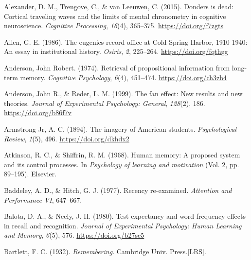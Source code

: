 \documentclass[
  oneside,
  12pt]{crumpbook}
\newlength{\cslhangindent}
\newlength{\cslentryspacingunit} %
\newenvironment{CSLReferences}[2] %
 {%
  \setlength{\parindent}{0pt}
  \ifodd #1
  \let\oldpar\par
  \def\par{\hangindent=\cslhangindent\oldpar}
  \fi
  \setlength{\parskip}{#2\cslentryspacingunit}
 }%
 {}
\begin{document}
\hypertarget{refs}{}
\begin{CSLReferences}{1}{0}
\leavevmode{}%
Alexander, D. M., Trengove, C., \& van Leeuwen, C. (2015). Donders is dead: Cortical traveling waves and the limits of mental chronometry in cognitive neuroscience. \emph{Cognitive Processing}, \emph{16}(4), 365--375. \url{https://doi.org/f7zgts}

\leavevmode{}%
Allen, G. E. (1986). The eugenics record office at {Cold Spring Harbor}, 1910-1940: An essay in institutional history. \emph{Osiris}, \emph{2}, 225--264. \url{https://doi.org/fqthgg}

\leavevmode{}%
Anderson, John Robert. (1974). Retrieval of propositional information from long-term memory. \emph{Cognitive Psychology}, \emph{6}(4), 451--474. \url{https://doi.org/ch3zb4}

\leavevmode{}%
Anderson, John R., \& Reder, L. M. (1999). The fan effect: {New} results and new theories. \emph{Journal of Experimental Psychology: General}, \emph{128}(2), 186. \url{https://doi.org/b86f7v}

\leavevmode{}%
Armstrong Jr, A. C. (1894). The imagery of {American} students. \emph{Psychological Review}, \emph{1}(5), 496. \url{https://doi.org/dkhdx2}

\leavevmode{}%
Atkinson, R. C., \& Shiffrin, R. M. (1968). Human memory: {A} proposed system and its control processes. In \emph{Psychology of learning and motivation} (Vol. 2, pp. 89--195). {Elsevier}.

\leavevmode{}%
Baddeley, A. D., \& Hitch, G. J. (1977). Recency re-examined. \emph{Attention and Performance VI}, 647--667.

\leavevmode{}%
Balota, D. A., \& Neely, J. H. (1980). Test-expectancy and word-frequency effects in recall and recognition. \emph{Journal of Experimental Psychology: Human Learning and Memory}, \emph{6}(5), 576. \url{https://doi.org/b27sc5}

\leavevmode{}%
Bartlett, F. C. (1932). \emph{Remembering}. {Cambridge Univ. Press.{[}LRS{]}}.


\end{CSLReferences}
\end{document}
